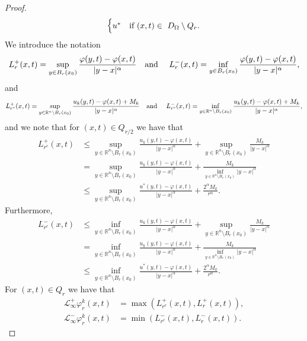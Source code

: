 \documentclass[11pt]{article}
\providecommand{\Lpos}{\mathcal{L}_{\infty}^+}
\providecommand{\Lneg}{\mathcal{L}_{\infty}^-}
\providecommand{\Rn}{\mathbb{R}^n}
\providecommand{\Rnp}{D_{\Omega}}
\numberwithin{equation}{section}
\theoremstyle{definition}
\begin{document}
\begin{proof}
\begin{align*}
\begin{cases}
                      u^* & \textup{if  } (x,t) \in \ \Rnp \setminus Q_r.
            \end{cases}
 \end{align*}
We introduce the notation
    \begin{equation*}
        L^+_{r}(x,t) = \sup_{y \in B_r(x_0)} \frac{\varphi(y,t)-\varphi(x,t)}{|y-x|^{\alpha}} \quad \textup{and } \quad L^-_{r}(x,t) = \inf_{y \in B_r(x_0)} \frac{\varphi(y,t)-\varphi(x,t)}{|y-x|^{\alpha}},
    \end{equation*}
and
    \begin{equation*}
        L^+_{r^c}(x,t) = \sup_{y \in \Rn \setminus B_r(x_0)} \frac{u_k(y,t)-\varphi(x,t)+M_k}{|y-x|^{\alpha}} \quad \textup{and } \quad L^-_{r^c}(x,t) = \inf_{y \in \Rn \setminus B_r(x_0)} \frac{u_k(y,t)-\varphi(x,t) +M_k}{|y-x|^{\alpha}},
    \end{equation*}
    and we note that for $(x,t) \in Q_{r/2}$ we have that
\begin{align*}
     L^+_{r^c}(x,t) &\leq \sup_{y \in \Rn \setminus B_r(x_0)} \frac{u_k(y,t)-\varphi(x,t)}{|y-x|^{\alpha}} + \sup_{y \in \Rn \setminus B_r(x_0)} \frac{M_k}{|y-x|^{\alpha}} \\
     &= \sup_{y \in \Rn \setminus B_r(x_0)} \frac{u_k(y,t)-\varphi(x,t)}{|y-x|^{\alpha}} + \frac{M_k}{\inf_{y \in \Rn \setminus B_r(x_0)}|y-x|^{\alpha}} \\
     & \leq \sup_{y \in \Rn \setminus B_r(x_0)} \frac{u^*(y,t)-\varphi(x,t)}{|y-x|^{\alpha}} + \frac{2^{\alpha} M_k}{r^{\alpha}}.
\end{align*}
Furthermore,
\begin{align*}
    L^-_{r^c}(x,t) &\leq \inf_{y \in \Rn \setminus B_r(x_0)} \frac{u_k(y,t)-\varphi(x,t)}{|y-x|^{\alpha}} + \sup_{y \in \Rn \setminus B_r(x_0)} \frac{M_k}{|y-x|^{\alpha}} \\
     &= \inf_{y \in \Rn \setminus B_r(x_0)} \frac{u_k(y,t)-\varphi(x,t)}{|y-x|^{\alpha}} + \frac{M_k}{\inf_{y \in \Rn \setminus B_r(x_0)}|y-x|^{\alpha}} \\
     & \leq \inf_{y \in \Rn \setminus B_r(x_0)} \frac{u^*(y,t)-\varphi(x,t)}{|y-x|^{\alpha}} + \frac{2^{\alpha} M_k}{r^{\alpha}}.
\end{align*}
For $(x,t) \in Q_r$ we have that
    \begin{align*}
        \Lpos \varphi_{r}^k(x,t) &= \max(L^+_{r^c}(x,t), L^+_{r}(x,t)), \\
        \Lneg \varphi_{r}^k(x,t) &= \min(L^-_{r^c}(x,t), L^-_{r}(x,t)).
    \end{align*}

\end{proof}
\end{document}

